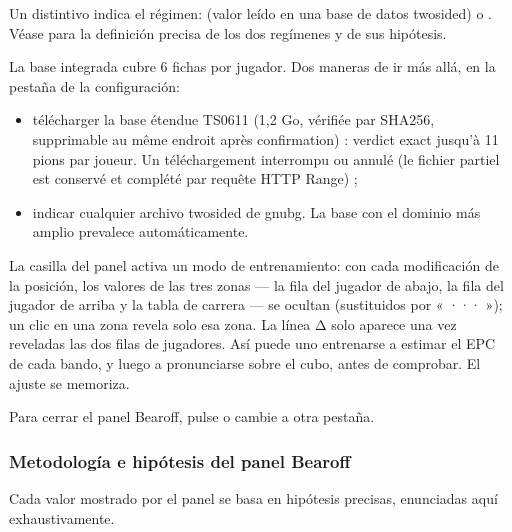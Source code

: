 \documentclass[letterpaper,10pt,spanish]{sphinxmanual}
\begin{document}
\sphinxAtStartPar
Un distintivo indica el régimen:  (valor leído en una base de datos two\sphinxhyphen{}sided) o . Véase {\hyperref[\detokenize{manuel:epc-methodologie}]{}} para la definición precisa de los dos regímenes y de sus hipótesis.

\sphinxAtStartPar
{} La base integrada cubre 6 fichas por jugador. Dos maneras de ir más allá, en la pestaña  de la configuración:
\begin{itemize}
\item {} 
\sphinxAtStartPar
télécharger la base étendue TS\sphinxhyphen{}06\sphinxhyphen{}11 (1,2 Go, vérifiée par SHA\sphinxhyphen{}256,
supprimable au même endroit après confirmation) : verdict exact jusqu’à
11 pions par joueur. Un téléchargement interrompu ou annulé  (le fichier partiel est conservé et complété par
requête HTTP Range) ;

\item {} 
\sphinxAtStartPar
indicar cualquier archivo  two\sphinxhyphen{}sided de gnubg. La base con el dominio más amplio prevalece automáticamente.

\end{itemize}

\sphinxAtStartPar
{} La casilla  del panel activa un modo de entrenamiento: con cada modificación de la posición, los valores de las tres zonas — la fila del jugador de abajo, la fila del jugador de arriba y la tabla de carrera — se ocultan (sustituidos por « ··· »); un clic en una zona revela solo esa zona. La línea Δ solo aparece una vez reveladas las dos filas de jugadores. Así puede uno entrenarse a estimar el EPC de cada bando, y luego a pronunciarse sobre el cubo, antes de comprobar. El ajuste se memoriza.

\sphinxAtStartPar
Para cerrar el panel Bearoff, pulse  o cambie a otra pestaña.


\subsubsection{Metodología e hipótesis del panel Bearoff}
\label{\detokenize{manuel:methodologie-et-hypotheses-du-panneau-bearoff}}\label{\detokenize{manuel:epc-methodologie}}
\sphinxAtStartPar
Cada valor mostrado por el panel se basa en hipótesis precisas, enunciadas aquí exhaustivamente.
\end{document}
